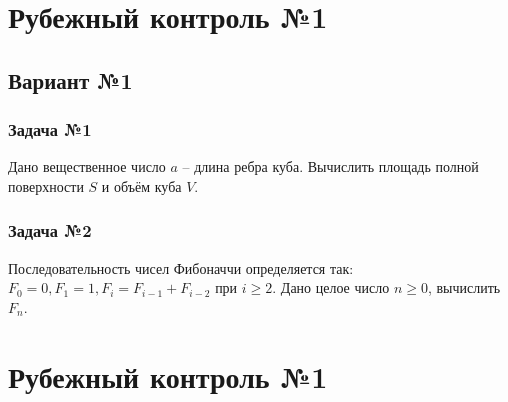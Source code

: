 \documentclass[12pt,a5paper,landscape]{article}
\begin{document}
\parindent=1cm
\pagestyle{empty}



\clearpage
\section*{Рубежный контроль №1}
\subsection*{Вариант №1}
\subsubsection*{Задача №1}
Дано вещественное число $a$ -- длина ребра куба. Вычислить площадь полной поверхности $S$ и объём куба $V$.
\subsubsection*{Задача №2}
Последовательность чисел Фибоначчи определяется так: $F_0 = 0, F_1 = 1, F_i = F_{i-1} + F_{i-2}$ при $i \ge 2$. Дано целое число $n \ge 0$, вычислить $F_n$.


\clearpage
\section*{Рубежный контроль №1}
\end{document}
